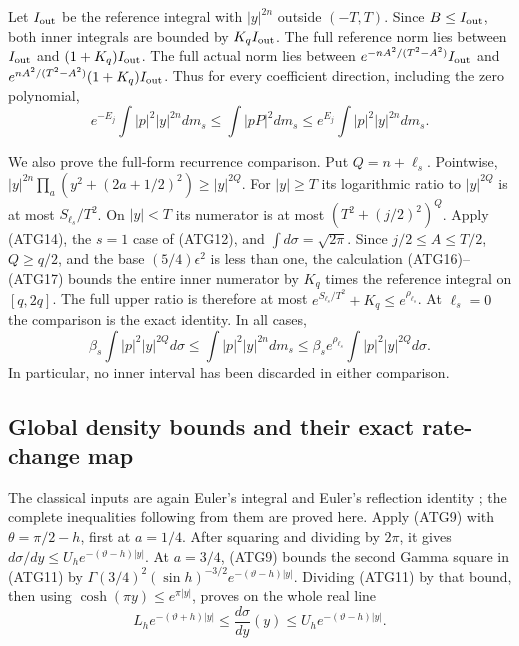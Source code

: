 Let $I_{\rm out}$ be the reference integral with $|y|^{2n}$
outside $(-T,T)$. Since $B\le I_{\rm out}$, both inner integrals
are bounded by $K_q I_{\rm out}$. The full reference norm lies
between $I_{\rm out}$ and $(1+K_q)I_{\rm out}$.
The full actual norm lies between
$e^{-nA^2/(T^2-A^2)}I_{\rm out}$ and
$e^{nA^2/(T^2-A^2)}(1+K_q)I_{\rm out}$.
Thus for every coefficient direction, including the zero polynomial,
\[
 e^{-E_j}\int|p|^2|y|^{2n}dm_s
 \le\int|pP|^2dm_s
 \le e^{E_j}\int|p|^2|y|^{2n}dm_s.
\tag{ATG18}
\]

We also prove the full-form recurrence comparison. Put $Q=n+\ell_s$.
Pointwise,
$|y|^{2n}\prod_a(y^2+(2a+1/2)^2)\ge |y|^{2Q}$.
For $|y|\ge T$ its logarithmic ratio to $|y|^{2Q}$ is at most
$S_{\ell_s}/T^2$. On $|y|<T$ its numerator is at most
$(T^2+(j/2)^2)^Q$.
Apply (ATG14), the $s=1$ case of (ATG12), and
$\int d\sigma=\sqrt{2\pi}$. Since $j/2\le A\le T/2$,
$Q\ge q/2$, and the base $(5/4)\epsilon^2$ is less than one,
the calculation (ATG16)--(ATG17) bounds the entire inner numerator
by $K_q$ times the reference integral on $[q,2q]$.
The full upper ratio is therefore at most
$e^{S_{\ell_s}/T^2}+K_q\le e^{\rho_{\ell_s}}$.
At $\ell_s=0$ the comparison is the exact identity. In all cases,
\[
 \beta_s\int|p|^2|y|^{2Q}d\sigma
 \le\int|p|^2|y|^{2n}dm_s
 \le\beta_s e^{\rho_{\ell_s}}\int|p|^2|y|^{2Q}d\sigma.
\tag{ATG19}
\]
In particular, no inner interval has been discarded in either
comparison.

\subsection{Global density bounds and their exact rate-change map}

The classical inputs are again Euler's integral and Euler's
reflection identity \cite[eqs.~(5.2.1), (5.5.3)]{human:dlmf5};
the complete inequalities following from them are proved here.
Apply (ATG9) with $\theta=\pi/2-h$, first at $a=1/4$.
After squaring and dividing by $2\pi$, it gives
$d\sigma/dy\le U_he^{-(\vartheta-h)|y|}$.
At $a=3/4$, (ATG9) bounds the second Gamma square in (ATG11)
by $\Gamma(3/4)^2(\sin h)^{-3/2}e^{-(\vartheta-h)|y|}$.
Dividing (ATG11) by that bound, then using
$\cosh(\pi y)\le e^{\pi|y|}$, proves on the whole real line
\[
 L_he^{-(\vartheta+h)|y|}
 \le\frac{d\sigma}{dy}(y)
 \le U_he^{-(\vartheta-h)|y|}.
\tag{ATG20}
\]

